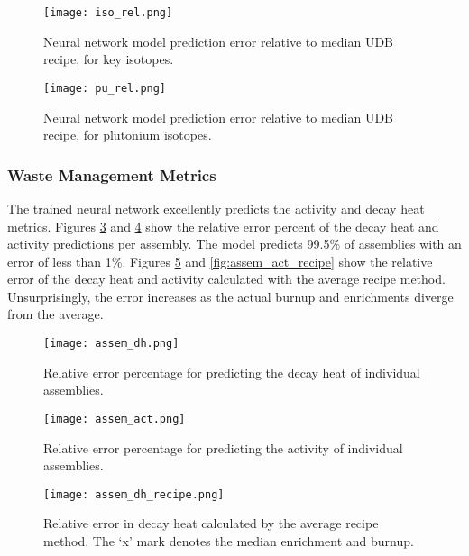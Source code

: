 \begin{figure}
    \centering
    \texttt{[image: iso\_rel.png]}
    \caption{Neural network model prediction error relative to median
             \gls{UDB} recipe, for key isotopes.}
    \label{fig:iso_rel}
\end{figure}


\begin{figure}
    \centering
    \texttt{[image: pu\_rel.png]}
    \caption{Neural network model prediction error relative to median
             \gls{UDB} recipe, for plutonium isotopes.}
    \label{fig:pu_rel}
\end{figure}

\FloatBarrier


\subsubsection{Waste Management Metrics}
The trained neural network excellently predicts the activity
and decay heat metrics. Figures \ref{fig:assem_dh} and \ref{fig:assem_act}
show the relative error percent of the decay heat and activity
predictions per assembly. The model predicts 99.5\% of
assemblies with an error of less than 1\%.
Figures \ref{fig:assem_dh_recipe} and
\ref{fig:assem_act_recipe} show the relative error
of the decay heat and activity calculated with the average
recipe method.
Unsurprisingly, the error increases as the actual burnup and enrichments
diverge from the average.

\begin{figure}
    \centering
    \texttt{[image: assem\_dh.png]}
    \caption{Relative error percentage for predicting the decay
             heat of individual assemblies.}
    \label{fig:assem_dh}
\end{figure}


\begin{figure}
    \centering
    \texttt{[image: assem\_act.png]}
    \caption{Relative error percentage for predicting the
             activity of individual assemblies.}
    \label{fig:assem_act}
\end{figure}



\begin{figure}
    \centering
    \texttt{[image: assem\_dh\_recipe.png]}
    \caption{Relative error in decay heat calculated by the average recipe
             method. The `x' mark denotes the median enrichment and
             burnup.}
    \label{fig:assem_dh_recipe}
\end{figure}

